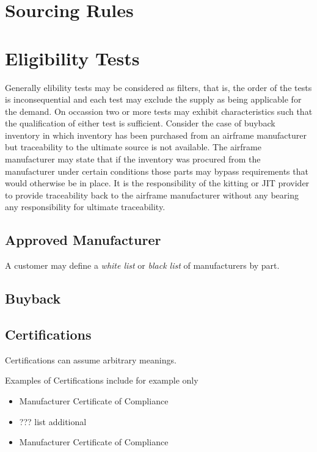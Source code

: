 \section{Sourcing Rules}

\section{Eligibility Tests}
Generally elibility tests may be considered as filters, that is, the order of the tests is inconsequential and 
each test may exclude the supply as being applicable for the demand.  On occassion two or more tests may exhibit
characteristics such that the qualification of either test is sufficient.  Consider the case of buyback inventory
in which inventory has been purchased from an airframe manufacturer but traceability to the ultimate source
is not available.  The airframe manufacturer may state that if the inventory was procured from the manufacturer
under certain conditions those parts may bypass requirements that would otherwise be in place.  It is the 
responsibility of the kitting or JIT provider to provide traceability back to the airframe manufacturer without
any bearing any responsibility for ultimate traceability.

\subsection{Approved Manufacturer}
A customer may define a \textit{white list} or \textit{black list} of manufacturers by part.

 
\subsection{Buyback}
\subsection{Certifications}
Certifications can assume arbitrary meanings.  

Examples of Certifications include for example only
\begin{itemize}
 \item Manufacturer Certificate of Compliance
 \item ??? list additional
\end{itemize}


\begin{itemize}
 \item Manufacturer Certificate of Compliance
 
\end{itemize}

